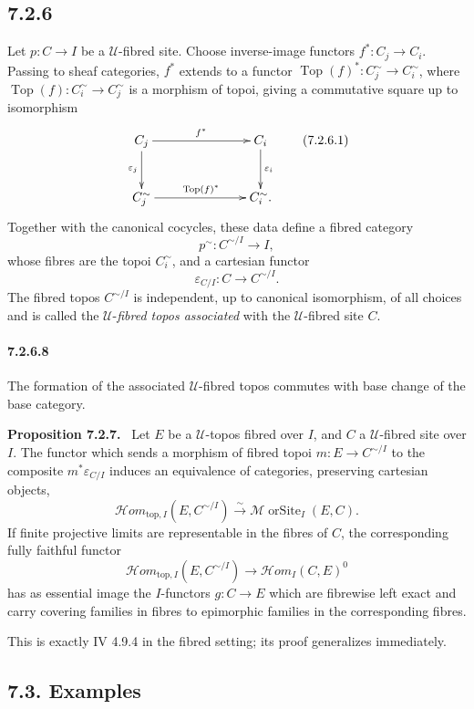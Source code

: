 \documentclass[11pt]{article}
\newcommand{\U}{\mathcal{U}}
\newcommand{\Top}{\operatorname{Top}}
\newcommand{\Mmorsite}{\mathcal{M}\!\operatorname{orSite}}
\newenvironment{statement}[1]{\par\medskip\noindent\textbf{#1.}\ }{\par\medskip}
\begin{document}
\subsection*{7.2.6}
Let \(p:C\to I\) be a \(\U\)-fibred site. Choose inverse-image functors \(f^*:C_j\to C_i\). Passing to sheaf categories, \(f^*\) extends to a functor \(\Top(f)^*:C_j^{\sim}\to C_i^{\sim}\), where \(\Top(f):C_i^{\sim}\to C_j^{\sim}\) is a morphism of topoi, giving a commutative square up to isomorphism
\[
\xymatrix@C=2.5cm@R=1cm{
C_j\ar[r]^{f^*}\ar[d]_{\varepsilon_j}&C_i\ar[d]^{\varepsilon_i}\\
C_j^{\sim}\ar[r]^{\Top(f)^*}&C_i^{\sim}.
}\tag{7.2.6.1}
\]
Together with the canonical cocycles, these data define a fibred category
\[
 p^{\sim}:C^{\sim/I}\to I, \tag{7.2.6.6}
\]
whose fibres are the topoi \(C_i^{\sim}\), and a cartesian functor
\[
 \varepsilon_{C/I}:C\to C^{\sim/I}. \tag{7.2.6.7}
\]
The fibred topos \(C^{\sim/I}\) is independent, up to canonical isomorphism, of all choices and is called the \(\U\)-\emph{fibred topos associated} with the \(\U\)-fibred site \(C\).

\paragraph*{7.2.6.8}
The formation of the associated \(\U\)-fibred topos commutes with base change of the base category.

\begin{statement}{Proposition 7.2.7}
Let \(E\) be a \(\U\)-topos fibred over \(I\), and \(C\) a \(\U\)-fibred site over \(I\). The functor which sends a morphism of fibred topoi \(m:E\to C^{\sim/I}\) to the composite \(m^*\varepsilon_{C/I}\) induces an equivalence of categories, preserving cartesian objects,
\[
 \mathcal{H}om_{\mathrm{top},I}(E,C^{\sim/I})\xrightarrow{\sim}\Mmorsite_I(E,C).
\]
If finite projective limits are representable in the fibres of \(C\), the corresponding fully faithful functor
\[
 \mathcal{H}om_{\mathrm{top},I}(E,C^{\sim/I})\to\mathcal{H}om_I(C,E)^0
\]
has as essential image the \(I\)-functors \(g:C\to E\) which are fibrewise left exact and carry covering families in fibres to epimorphic families in the corresponding fibres.
\end{statement}

This is exactly IV 4.9.4 in the fibred setting; its proof generalizes immediately.

\subsection*{7.3. Examples}
\end{document}
